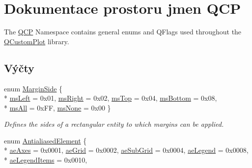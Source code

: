 \hypertarget{namespaceQCP}{}\section{Dokumentace prostoru jmen Q\+C\+P}
\label{namespaceQCP}


The \hyperlink{namespaceQCP}{Q\+C\+P} Namespace contains general enums and Q\+Flags used throughout the \hyperlink{classQCustomPlot}{Q\+Custom\+Plot} library.  


\subsection*{Výčty}
\begin{DoxyCompactItemize}
\item 
enum \hyperlink{namespaceQCP_a7e487e3e2ccb62ab7771065bab7cae54}{Margin\+Side} \{ \\*
\hyperlink{namespaceQCP_a7e487e3e2ccb62ab7771065bab7cae54a9500c8bfcc9e80b9dff0a8e00e867f07}{ms\+Left} = 0x01, 
\hyperlink{namespaceQCP_a7e487e3e2ccb62ab7771065bab7cae54a93c719593bb2b94ed244d52c86d83b65}{ms\+Right} = 0x02, 
\hyperlink{namespaceQCP_a7e487e3e2ccb62ab7771065bab7cae54a5db8fb0d0b0ecf0d611c2602a348e8a0}{ms\+Top} = 0x04, 
\hyperlink{namespaceQCP_a7e487e3e2ccb62ab7771065bab7cae54a5241d8eac2bab9524a38889f576179cc}{ms\+Bottom} = 0x08, 
\\*
\hyperlink{namespaceQCP_a7e487e3e2ccb62ab7771065bab7cae54a43d7361cb0c5244eabdc962021bffebc}{ms\+All} = 0x\+F\+F, 
\hyperlink{namespaceQCP_a7e487e3e2ccb62ab7771065bab7cae54a80aa4149f16dabd538f8b2e3d42c42d5}{ms\+None} = 0x00
 \}\begin{DoxyCompactList}\small\item\em Defines the sides of a rectangular entity to which margins can be applied. \end{DoxyCompactList}
\item 
enum \hyperlink{namespaceQCP_ae55dbe315d41fe80f29ba88100843a0c}{Antialiased\+Element} \{ \\*
\hyperlink{namespaceQCP_ae55dbe315d41fe80f29ba88100843a0caefa92e89cd37f8a081fd2075aa1af73f}{ae\+Axes} = 0x0001, 
\hyperlink{namespaceQCP_ae55dbe315d41fe80f29ba88100843a0ca4fbb37118d62288af0ca601ff2b07a2f}{ae\+Grid} = 0x0002, 
\hyperlink{namespaceQCP_ae55dbe315d41fe80f29ba88100843a0caaedf83369188a15a69f92bb1d85ca97b}{ae\+Sub\+Grid} = 0x0004, 
\hyperlink{namespaceQCP_ae55dbe315d41fe80f29ba88100843a0ca9e0127a6361b5d0596b031a482c5cf97}{ae\+Legend} = 0x0008, 
\\*
\hyperlink{namespaceQCP_ae55dbe315d41fe80f29ba88100843a0ca1aca7a50c1b95403958733a4acafe773}{ae\+Legend\+Items} = 0x0010, 

\end{DoxyCompactItemize}
